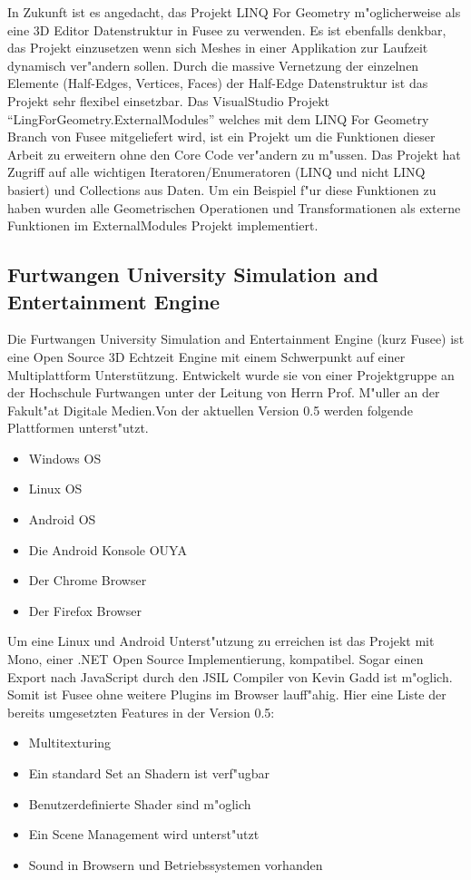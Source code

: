 \documentclass[pagesize, paper=a4, fontsize=12pt,titlepage=true, headings=small, headnosepline, abstractoff, liststotoc, nochapterprefix, plainheadsepline]{scrreprt}
\newcommand{\LFGS}{LINQ For Geometry }
\newcommand{\HES}{Half-Edge Datenstruktur }
\begin{document}
In Zukunft ist es angedacht, das Projekt \LFGS m"oglicherweise als eine 3D Editor Datenstruktur in Fusee zu verwenden. Es ist ebenfalls denkbar, das Projekt einzusetzen wenn sich Meshes in einer Applikation zur Laufzeit dynamisch ver"andern sollen. Durch die massive Vernetzung der einzelnen Elemente (Half-Edges, Vertices, Faces) der \HES ist das Projekt sehr flexibel einsetzbar. Das VisualStudio Projekt "`LingForGeometry.ExternalModules"' welches mit dem \LFGS Branch von Fusee mitgeliefert wird, ist ein Projekt um die Funktionen dieser Arbeit zu erweitern ohne den Core Code ver"andern zu m"ussen. Das Projekt hat Zugriff auf alle wichtigen Iteratoren/Enumeratoren (LINQ und nicht LINQ basiert) und Collections aus Daten. Um ein Beispiel f"ur diese Funktionen zu haben wurden alle Geometrischen Operationen und Transformationen als externe Funktionen im ExternalModules Projekt implementiert.
		\subsection {Furtwangen University Simulation and Entertainment Engine}\label{sec:fusee}
			Die Furtwangen University Simulation and Entertainment Engine (kurz Fusee) ist eine Open Source 3D Echtzeit Engine mit einem Schwerpunkt auf einer Multiplattform Unterstützung. Entwickelt wurde sie von einer Projektgruppe an der Hochschule Furtwangen unter der Leitung von Herrn Prof. M"uller an der Fakult"at Digitale Medien.Von der aktuellen Version 0.5 werden folgende Plattformen unterst"utzt.
\begin{itemize}
\item Windows OS
\item Linux OS
\item Android OS
\item Die Android Konsole OUYA
\item Der Chrome Browser
\item Der Firefox Browser
\end{itemize}

Um eine Linux und Android Unterst"utzung zu erreichen ist das Projekt mit Mono, einer .NET Open Source Implementierung, kompatibel. Sogar einen Export nach JavaScript durch den JSIL Compiler von Kevin Gadd ist m"oglich. Somit ist Fusee ohne weitere Plugins im Browser lauff"ahig.
\newpage
Hier eine Liste der bereits umgesetzten Features in der Version 0.5:
\begin{itemize}
\item Multitexturing
\item Ein standard Set an Shadern ist verf"ugbar
\item Benutzerdefinierte Shader sind m"oglich
\item Ein Scene Management wird unterst"utzt
\item Sound in Browsern und Betriebssystemen vorhanden
\end{itemize}
\end{document}

